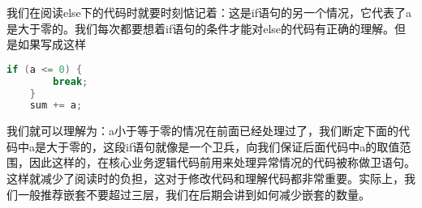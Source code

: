 我们在阅读else下的代码时就要时刻惦记着：这是if语句的另一个情况，它代表了a是大于零的。我们每次都要想着if语句的条件才能对else的代码有正确的理解。但是如果写成这样

\begin{lstlisting}[language=C]
    if (a <= 0) {
        break;
    }
    sum += a;
\end{lstlisting}

我们就可以理解为：a小于等于零的情况在前面已经处理过了，我们断定下面的代码中a是大于零的，这段if语句就像是一个卫兵，向我们保证后面代码中a的取值范围，因此这样的，在核心业务逻辑代码前用来处理异常情况的代码被称做卫语句。这样就减少了阅读时的负担，这对于修改代码和理解代码都非常重要。实际上，我们一般推荐嵌套不要超过三层，我们在后期会讲到如何减少嵌套的数量。
